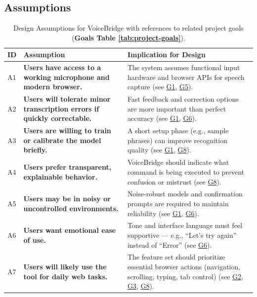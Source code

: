 \documentclass[11pt]{article}
\begin{document}
\subsection{Assumptions}
\begin{table}[H]
\centering
\begin{tabularx}{\textwidth}{p{1cm}p{6cm}X}
\toprule {\textbf{ID}} & {\textbf{Assumption}} & {\textbf{Implication for Design}}\\
\midrule
A1 & \textbf{Users have access to a working microphone and modern browser.} & The system assumes functional input hardware and browser APIs for speech capture (see \hyperref[tab:project-goals]{G1}, \hyperref[tab:project-goals]{G5}). \\ \hline
A2 & \textbf{Users will tolerate minor transcription errors if quickly correctable.} & Fast feedback and correction options are more important than perfect accuracy (see \hyperref[tab:project-goals]{G1}, \hyperref[tab:project-goals]{G6}). \\ \hline
A3 & \textbf{Users are willing to train or calibrate the model briefly.} & A short setup phase (e.g., sample phrases) can improve recognition quality (see \hyperref[tab:project-goals]{G1}, \hyperref[tab:project-goals]{G8}). \\ \hline
A4 & \textbf{Users prefer transparent, explainable behavior.} & VoiceBridge should indicate what command is being executed to prevent confusion or mistrust (see \hyperref[tab:project-goals]{G8}). \\ \hline
A5 & \textbf{Users may be in noisy or uncontrolled environments.} & Noise-robust models and confirmation prompts are required to maintain reliability (see \hyperref[tab:project-goals]{G1}, \hyperref[tab:project-goals]{G6}). \\ \hline
A6 & \textbf{Users want emotional ease of use.} & Tone and interface language must feel supportive — e.g., “Let’s try again” instead of “Error” (see \hyperref[tab:project-goals]{G6}). \\ \hline
A7 & \textbf{Users will likely use the tool for daily web tasks.} & The feature set should prioritize essential browser actions (navigation, scrolling, typing, tab control) (see \hyperref[tab:project-goals]{G2}, \hyperref[tab:project-goals]{G3}, \hyperref[tab:project-goals]{G8}). \\
\bottomrule
\end{tabularx}
\caption{Design Assumptions for VoiceBridge with references to related project goals (\textbf{Goals Table \ref{tab:project-goals}}).}
\label{tab:assumptions}
\end{table}
\end{document}

